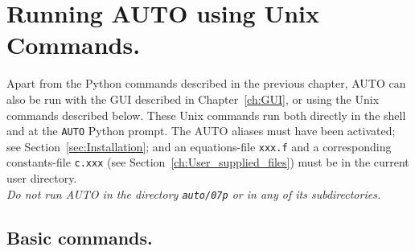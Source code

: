 \documentclass[12pt]{report}
\begin{document}
\chapter{ Running {\cal AUTO} using Unix Commands.} \label{sec:command_mode}
Apart from the Python commands described in the previous chapter,
{\cal AUTO} can also be run with the GUI described in Chapter~\ref{ch:GUI},
or using the Unix commands described below. These Unix commands run both
directly in the shell and at the {\tt AUTO} Python prompt.
The {\cal AUTO} aliases must have been activated; see Section~\ref{sec:Installation}; 
and an equations-file {\tt xxx.f} 
and a corresponding constants-file {\tt c.xxx} 
(see Section~\ref{ch:User_supplied_files})
must be in the current user directory.
\\
{\it Do not run {\cal AUTO} in the directory {\tt auto/07p} 
or in any of its subdirectories.}

\section{ Basic commands.} 
\end{document}
